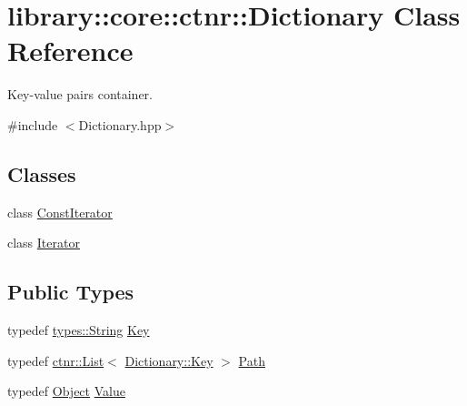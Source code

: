 \hypertarget{classlibrary_1_1core_1_1ctnr_1_1_dictionary}{}\section{library\+:\+:core\+:\+:ctnr\+:\+:Dictionary Class Reference}
\label{classlibrary_1_1core_1_1ctnr_1_1_dictionary}


Key-\/value pairs container.  




{\ttfamily \#include $<$Dictionary.\+hpp$>$}

\subsection*{Classes}
\begin{DoxyCompactItemize}
\item 
class \hyperlink{classlibrary_1_1core_1_1ctnr_1_1_dictionary_1_1_const_iterator}{Const\+Iterator}
\item 
class \hyperlink{classlibrary_1_1core_1_1ctnr_1_1_dictionary_1_1_iterator}{Iterator}
\end{DoxyCompactItemize}
\subsection*{Public Types}
\begin{DoxyCompactItemize}
\item 
typedef \hyperlink{classlibrary_1_1core_1_1types_1_1_string}{types\+::\+String} \hyperlink{classlibrary_1_1core_1_1ctnr_1_1_dictionary_a987cae687cce70d81a2a483c5e05e842}{Key}
\item 
typedef \hyperlink{namespacelibrary_1_1core_1_1ctnr_a87ccf40619002299b341a5e76e989912}{ctnr\+::\+List}$<$ \hyperlink{classlibrary_1_1core_1_1ctnr_1_1_dictionary_a987cae687cce70d81a2a483c5e05e842}{Dictionary\+::\+Key} $>$ \hyperlink{classlibrary_1_1core_1_1ctnr_1_1_dictionary_a5240b2a04a39b841ed81e52e962f0cbf}{Path}
\item 
typedef \hyperlink{classlibrary_1_1core_1_1ctnr_1_1_object}{Object} \hyperlink{classlibrary_1_1core_1_1ctnr_1_1_dictionary_a3baf6692694e4fc27cb399ac083c88ea}{Value}
\end{DoxyCompactItemize}
